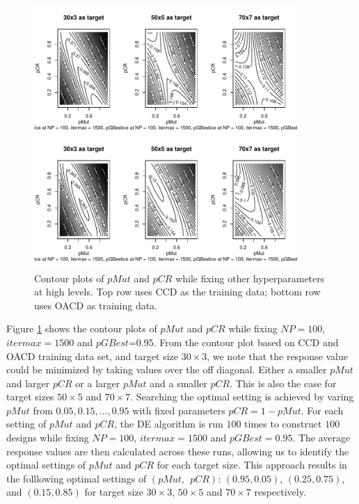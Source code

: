\documentclass [PhD] {package/uclathes}
\begin{document}

\begin{figure}
\centering
\includegraphics[height=10cm, width=\textwidth]{chapters/DE/pdfs/contours}
\caption{Contour plots of $pMut$ and $pCR$ while fixing other hyperparameters at high levels. Top row uses CCD as the training data; bottom row uses OACD as training data.}
\label{fig:contours}
\end{figure}

Figure \ref{fig:contours} shows the contour plots of $pMut$ and $pCR$ while fixing $NP=100$, $itermax=1500$ and $pGBest$=0.95. From the contour plot based on CCD and OACD training data set, and target size $30\times 3$, we note that the response value could be minimized by taking values over the off diagonal. Either a smaller $pMut$ and larger $pCR$ or a larger $pMut$ and a smaller $pCR$. This is also the case for target sizes $50\times5$ and $70\times 7$. Searching the optimal setting is achieved by  varing $pMut$ from $0.05, 0.15, \ldots, 0.95$ with fixed parameters $pCR=1-pMut$. For each setting of $pMut$ and $pCR$, the DE algorithm is run $100$ times to construct $100$ designs while fixing $NP=100$, $itermax=1500$ and $pGBest=0.95$. The average response values are then calculated across these runs, allowing us to identify the optimal settings of $pMut$ and $pCR$ for each target size. This approach results in the folllowing optimal settings of $(pMut,~~ pCR)$: $(0.95, 0.05)$, $(0.25, 0.75)$, and $(0.15, 0.85)$ for target size $30\times3$, $50\times5$ and $70\times7$ respectively.
\end{document}
